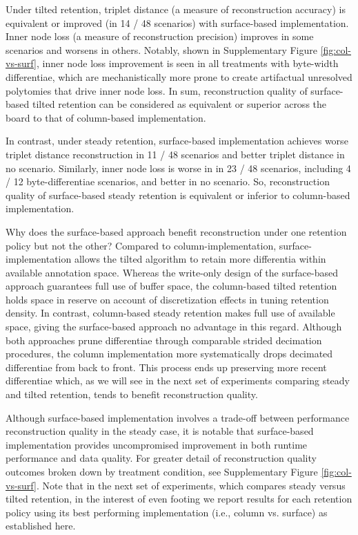 Under tilted retention, triplet distance (a measure of reconstruction accuracy) is equivalent or improved (in 14 / 48 scenarios) with surface-based implementation.
Inner node loss (a measure of reconstruction precision) improves in some scenarios and worsens in others.
Notably, shown in Supplementary Figure \ref{fig:col-vs-surf}, inner node loss improvement is seen in all treatments with byte-width differentiae, which are mechanistically more prone to create artifactual unresolved polytomies that drive inner node loss.
In sum, reconstruction quality of surface-based tilted retention can be considered as equivalent or superior across the board to that of column-based implementation.

In contrast, under steady retention, surface-based implementation achieves worse triplet distance reconstruction in 11 / 48 scenarios and better triplet distance in no scenario.
Similarly, inner node loss is worse in in 23 / 48 scenarios, including 4 / 12 byte-differentiae scenarios, and better in no scenario.
So, reconstruction quality of surface-based steady retention is equivalent or inferior to column-based implementation.

Why does the surface-based approach benefit reconstruction under one retention policy but not the other?
Compared to column-implementation, surface-implementation allows the tilted algorithm to retain more differentia within available annotation space.
Whereas the write-only design of the surface-based approach guarantees full use of buffer space, the column-based tilted retention holds space in reserve on account of discretization effects in tuning retention density.
In contrast, column-based steady retention makes full use of available space, giving the surface-based approach no advantage in this regard.
Although both approaches prune differentiae through comparable strided decimation procedures, the column implementation more systematically drops decimated differentiae from back to front.
This process ends up preserving more recent differentiae which, as we will see in the next set of experiments comparing steady and tilted retention, tends to benefit reconstruction quality.

Although surface-based implementation involves a trade-off between performance reconstruction quality in the steady case, it is notable that surface-based implementation provides uncompromised improvement in both runtime performance and data quality.
For greater detail of reconstruction quality outcomes broken down by treatment condition, see Supplementary Figure \ref{fig:col-vs-surf}.
Note that in the next set of experiments, which compares steady versus tilted retention, in the interest of even footing we report results for each retention policy using its best performing implementation (i.e., column vs. surface) as established here.

